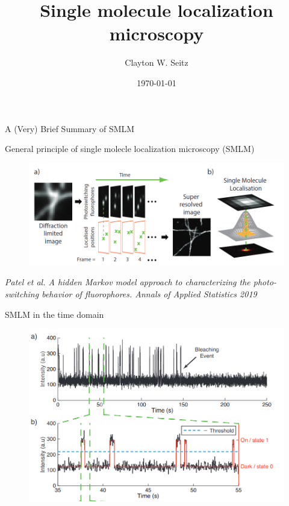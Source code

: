 \documentclass[aspectratio=169]{beamer}
\title{Single molecule localization microscopy}	%
\author{Clayton W. Seitz}								%
\date{\today}									%
\begin{document}
\begin{frame}
  \titlepage
\end{frame}

\begin{frame}[plain]
  \centering
  \Large A (Very) Brief Summary of SMLM
\end{frame}


\begin{frame}{General principle of single molecle localization microscopy (SMLM)}

\begin{figure}
\includegraphics[scale=0.4]{Figure-1}
\end{figure}
\textit{Patel et al. A hidden Markov model approach to characterizing the photo-switching behavior of fluorophores. Annals of Applied Statistics 2019}
\end{frame}

\begin{frame}{SMLM in the time domain}

\begin{figure}
\includegraphics[scale=0.325]{Figure-3}
\end{figure}

\end{frame}
\end{document}
